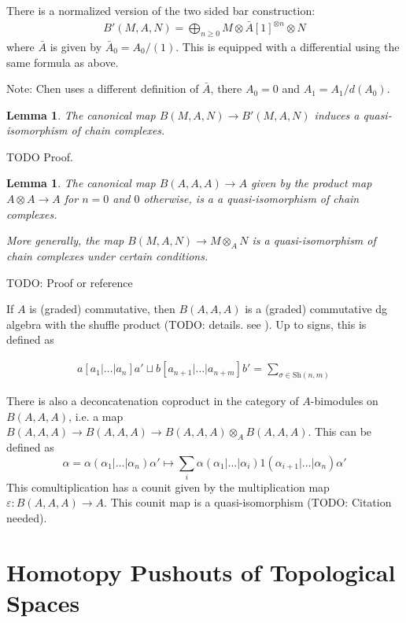 \documentclass{scrartcl}
\theoremstyle{plain}
\newtheorem{lemma}[theorem]{Lemma}
\theoremstyle{definition}
\newcommand{\shuffle}{\mathbin{\sqcup}}
\begin{document}
There is a normalized version of the two sided bar construction:
\begin{align*}
    B'(M, A, N) = \bigoplus_{n\geq 0} M\otimes \bar A[1]^{\otimes n}\otimes N
\end{align*}
where $\bar A$ is given by $\bar A_0 = A_0/(1)$. This is equipped with a differential using the same formula as above.

Note: Chen uses a different definition of $\bar A$, there $A_0 = 0$ and $A_1 = A_1 / d(A_0)$.

\begin{lemma}
    The canonical map $B(M, A, N)\to B'(M, A, N)$ induces a quasi-isomorphism of chain complexes.
\end{lemma}
TODO Proof.

\begin{lemma}\label{thm:bar_resolution}
    The canonical map $B(A, A, A)\to A$ given by the product map $A\otimes A\to A$ for $n=0$ and $0$ otherwise, is a a quasi-isomorphism of chain complexes.

    More generally, the map $B(M,A,N)\to M\otimes_A N$ is a quasi-isomorphism of chain complexes under certain conditions.
\end{lemma}
TODO: Proof or reference

If $A$ is (graded) commutative, then $B(A, A, A)$ is a (graded) commutative dg algebra with the shuffle product (TODO: details. see \cite[4.1]{chen1973iterated}). Up to signs, this is defined as

\begin{align*}
    a[a_1|\dots|a_n]a' \shuffle b[a_{n+1}|\dots|a_{n+m}]b' = \sum_{\sigma\in\mathrm{Sh}(n, m)}
\end{align*}

There is also a deconcatenation coproduct in the category of $A$-bimodules on $B(A, A, A)$, i.e. a map $B(A, A, A)\to B(A, A, A)\to B(A, A, A)\otimes_A B(A, A, A)$. This can be defined as 
$$\alpha = \alpha(\alpha_1|\dots|\alpha_n)\alpha' \mapsto \sum_i\alpha(\alpha_1|\dots|\alpha_i) 1 (\alpha_{i+1}|\dots|\alpha_n)\alpha'$$
This comultiplication has a counit given by the multiplication map $\varepsilon \colon B(A, A, A)\to A$. This counit map is a quasi-isomorphism (TODO: Citation needed).







\section{Homotopy Pushouts of Topological Spaces}
\end{document}
